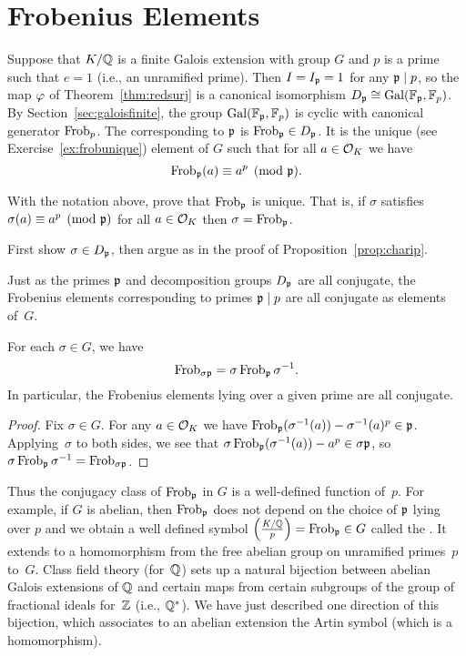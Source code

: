 \section{Frobenius Elements}

Suppose that $K/\mathbb{Q}$ is a finite Galois extension with group $G$ and $p$ is a
prime such that $e = 1$ (i.e., an unramified prime). Then $I = I_{\mathfrak{p}} = 1$ for
any $\mathfrak{p}\mid p$, so the map $\varphi$ of Theorem~\ref{thm:redsurj} is a canonical
isomorphism $D_{\mathfrak{p}} \cong \operatorname{Gal}(\mathbb{F}_{\mathfrak{p}},\mathbb{F}_p)$. By Section~\ref{sec:galoisfinite},
the group $\operatorname{Gal}(\mathbb{F}_{\mathfrak{p}},\mathbb{F}_p)$ is cyclic with canonical generator $\operatorname{Frob}_p$.
The  corresponding to $\mathfrak{p}$ is $\operatorname{Frob}_{\mathfrak{p}} \in D_{\mathfrak{p}}$.
It is the unique (see Exercise~\ref{ex:frobunique}) element of $G$ such that
for all $a\in\mathcal{O}_K$ we have
$$
	\operatorname{Frob}_{\mathfrak{p}}(a)\equiv a^p\pmod{\mathfrak{p}}.
$$

\begin{exercise}\label{ex:frobunique}
	With the notation above, prove that $\operatorname{Frob}_{\mathfrak{p}}$ is unique.
	That is, if $\sigma$ satisfies $\sigma(a) \equiv a^p \pmod{\mathfrak{p}}$
	for all $a\in\mathcal{O}_K$ then $\sigma = \operatorname{Frob}_{\mathfrak{p}}$.

	\begin{hint}
		First show $\sigma\in D_{\mathfrak{p}}$, then argue as in
		the proof of Proposition~\ref{prop:charip}.
	\end{hint}
\end{exercise}


Just as the primes $\mathfrak{p}$ and decomposition groups $D_{\mathfrak{p}}$ are all
conjugate, the Frobenius elements corresponding to primes
$\mathfrak{p}\mid p$ are all conjugate as elements of~$G$.

\begin{proposition}
	For each $\sigma \in G$, we have
	$$
		\operatorname{Frob}_{\sigma\mathfrak{p}} = \sigma\operatorname{Frob}_{\mathfrak{p}}\sigma^{-1}.
	$$
	In particular, the Frobenius elements lying over a given
	prime are all conjugate.
\end{proposition}
\begin{proof}
	Fix $\sigma\in G$. For any $a\in\mathcal{O}_K$ we have
	$\operatorname{Frob}_{\mathfrak{p}}(\sigma^{-1}(a)) - \sigma^{-1}(a)^p \in \mathfrak{p}$.
	Applying~$\sigma$ to both sides, we see that
	$\sigma\operatorname{Frob}_{\mathfrak{p}}(\sigma^{-1}(a)) - a^p \in \sigma\mathfrak{p}$,
	so $\sigma\operatorname{Frob}_{\mathfrak{p}}\sigma^{-1} = \operatorname{Frob}_{\sigma \mathfrak{p}}$.
\end{proof}

Thus the conjugacy class of $\operatorname{Frob}_{\mathfrak{p}}$ in $G$ is a well-defined
function of~$p$.  For example, if $G$ is abelian, then $\operatorname{Frob}_{\mathfrak{p}}$ does
not depend on the choice of $\mathfrak{p}$ lying over $p$ and we obtain a well
defined symbol $\left(\frac{K/\mathbb{Q}}{p}\right) = \operatorname{Frob}_{\mathfrak{p}}\in G$ called the .
It extends to a homomorphism from the free abelian
group on unramified primes~$p$ to~$G$.
Class field theory (for~$\mathbb{Q}$) sets up a natural bijection
between abelian Galois extensions of $\mathbb{Q}$ and certain maps from
certain subgroups of the group of fractional ideals for~$\mathbb{Z}$ (i.e., $\mathbb{Q}^*$).
We have just described one direction of this bijection, which associates to an
abelian extension the Artin symbol (which is a homomorphism).

